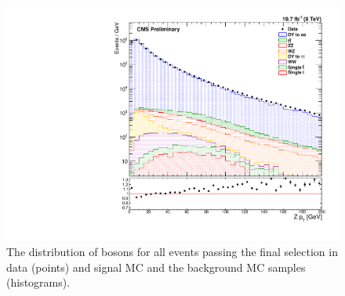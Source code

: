 \begin{figure}[p]
    \centering
    \includegraphics[width=\textwidth]{figures/z_pt_powheg.pdf}
    \caption[
        The \bosonpt distribution of \Z bosons in data and MC with \POWHEG
        signal MC.
    ]{
        The \bosonpt distribution of \Z bosons for all events passing the final
        selection in data (points) and \POWHEG signal MC and the background MC
        samples (histograms).
    }
    \label{fig:z_pt_powheg}
\end{figure}
